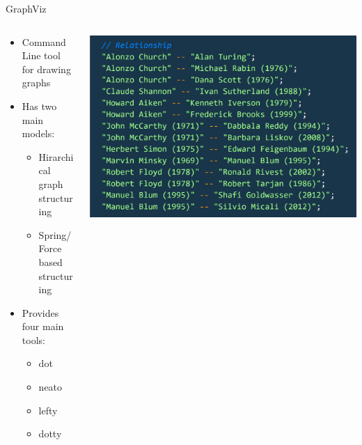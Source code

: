 \documentclass[11pt,aspectratio=169]{beamer}
\begin{document}
\begin{frame}{GraphViz}

    \begin{columns}
        \begin{column}{0.5\textwidth}
           \begin{itemize}
            \item Command Line tool for drawing graphs
            \item Has two main models:
            \begin{itemize}
                \item Hirarchical graph structuring
                \item Spring/Force based structuring \pause
            \end{itemize}
            \vspace{0.5cm}
            \item Provides four main tools: 
            \begin{itemize}
                \item dot
                \item neato
                \item lefty 
                \item dotty \pause
            \end{itemize}
        \end{itemize}
        \end{column}
        \begin{column}{0.5\textwidth}  %
            \begin{center}
             \includegraphics[width=1\textwidth]{relbasic.png}
             \end{center}
        \end{column}
    \end{columns}
\end{frame}
\end{document}
